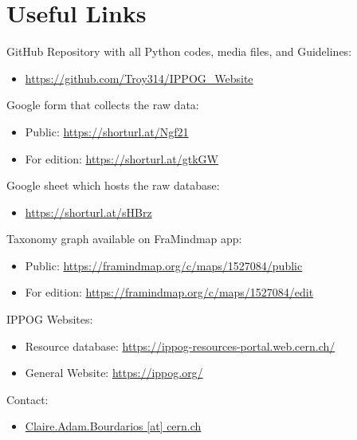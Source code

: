 \chapter{Useful Links}\label{chap:links}

GitHub Repository with all Python codes, media files, and Guidelines: 
\begin{itemize}
    \item \href{https://github.com/Troy314/IPPOG_Website}{https://github.com/Troy314/IPPOG\_Website}
\end{itemize}

\vspace{.1cm}

Google form that collects the raw data: 
\begin{itemize}
    \item Public: \href{https://docs.google.com/forms/d/e/1FAIpQLSckjdwv7daQZ8jv7D1wwx6mKeZo2Hp4hLGGmV8FT0VTthvOUg/viewform}{https://shorturl.at/Ngf21}
    \item For edition: \href{https://docs.google.com/forms/d/1DzX_IVaZAFX2ucAGyAKSgnYTvkAhOj0lDurSGn4De4E/edit?usp=send_form}{https://shorturl.at/gtkGW}
\end{itemize}

\vspace{.1cm}

Google sheet which hosts the raw database:
\begin{itemize}
    \item \href{https://docs.google.com/spreadsheets/d/1x_SdxdlHwG8chH77WqrTAAgijY2XBY3nPIi2p3TKqzs/edit?gid=1297224389#gid=1297224389}{https://shorturl.at/sHBrz}
\end{itemize}

\vspace{.1cm}

Taxonomy graph available on FraMindmap app:
\begin{itemize}
    \item Public: \href{https://framindmap.org/c/maps/1527084/public}{https://framindmap.org/c/maps/1527084/public}
    \item For edition: \href{https://framindmap.org/c/maps/1527084/edit}{https://framindmap.org/c/maps/1527084/edit}
\end{itemize}

\vspace{.1cm}

IPPOG Websites:
\begin{itemize}
    \item Resource database: \href{https://ippog-resources-portal.web.cern.ch/}{https://ippog-resources-portal.web.cern.ch/}
    \item General Website: \href{https://ippog.org/}{https://ippog.org/}
\end{itemize}

\vspace{.1cm}

Contact:
\begin{itemize}
    \item \href{mailto:Claire.Adam.Bourdarios@cern.ch}{Claire.Adam.Bourdarios [at] cern.ch}
\end{itemize}
